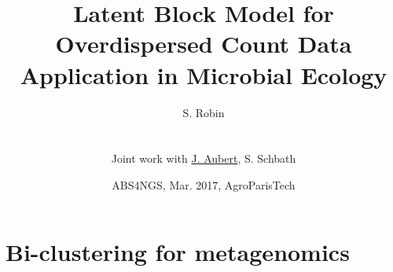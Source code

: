 \documentclass[11pt]{beamer}
\newcommand{\fignet}{/home/robin/Bureau/RECHERCHE/RESEAUX/EXPOSES/FIGURES}
\begin{document}

\title[LBM for metagenomics]{Latent Block Model for Overdispersed Count Data
Application in Microbial Ecology}

\author[S. Robin]{S. Robin \\ ~\\
  \begin{tabular}{ll}
    Joint work with \underline{J. Aubert}, S. Schbath
  \end{tabular}
  }


\date[Mar. 2017, AgroParisTech]{ABS4NGS, Mar. 2017, AgroParisTech}

\maketitle

\section{Bi-clustering for metagenomics}

\end{document}
